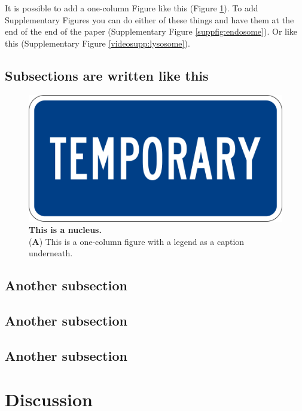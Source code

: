 It is possible to add a one-column Figure like this (Figure \ref{fig:nucleus}).
To add Supplementary Figures you can do either of these things and have them at the end of the end of the paper (Supplementary Figure \ref{suppfig:endosome}).
Or like this (Supplementary Figure \ref{videosupp:lysosome}).

\lipsum[10]

\subsection*{Subsections are written like this}

\lipsum[11]

\begin{figure}
\centering
\includegraphics[width=0.75\linewidth]{Figures/temp.png}
\caption{\textbf{This is a nucleus.}\\
(\textbf{A}) This is a one-column figure with a legend as a caption underneath.}
\label{fig:nucleus}
\end{figure}

\lipsum[12]

\subsection*{Another subsection}

\lipsum[13-14]

\subsection*{Another subsection}

\lipsum[13-14]

\subsection*{Another subsection}

\lipsum[13-14]

\section*{Discussion}\label{s:discussion}

